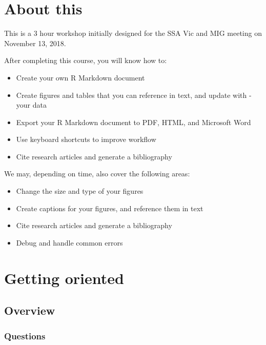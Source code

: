 \documentclass[]{article}
\title{}
\author{}
\date{}
\providecommand{\tightlist}{%
  \setlength{\itemsep}{0pt}\setlength{\parskip}{0pt}}
\begin{document}
{
\setcounter{tocdepth}{2}
\tableofcontents
}
\hypertarget{about-this}{%
\section{About this}\label{about-this}}

This is a 3 hour workshop initially designed for the SSA Vic and MIG
meeting on November 13, 2018.

After completing this course, you will know how to:

\begin{itemize}
\tightlist
\item
  Create your own R Markdown document
\item
  Create figures and tables that you can reference in text, and update
  with - your data
\item
  Export your R Markdown document to PDF, HTML, and Microsoft Word
\item
  Use keyboard shortcuts to improve workflow
\item
  Cite research articles and generate a bibliography
\end{itemize}

We may, depending on time, also cover the following areas:

\begin{itemize}
\tightlist
\item
  Change the size and type of your figures
\item
  Create captions for your figures, and reference them in text
\item
  Cite research articles and generate a bibliography
\item
  Debug and handle common errors
\end{itemize}

\hypertarget{getting-oriented}{%
\section{Getting oriented}\label{getting-oriented}}

\hypertarget{overview}{%
\subsection{Overview}\label{overview}}

\hypertarget{questions}{%
\subsubsection{Questions}\label{questions}}
\end{document}
